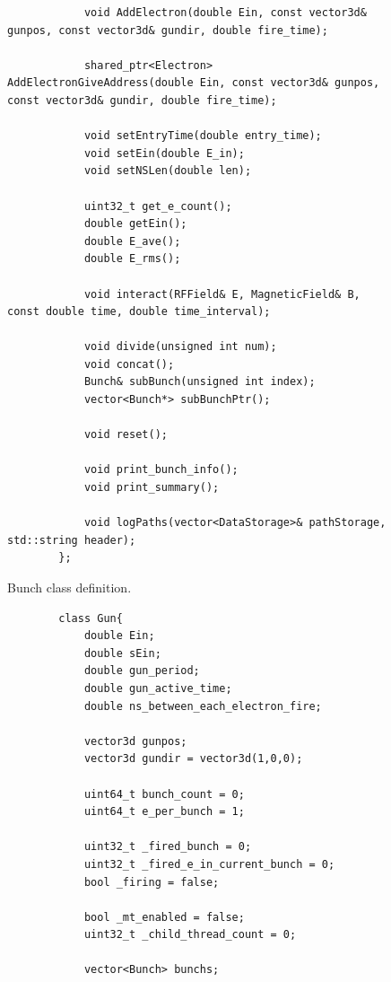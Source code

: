 \documentclass[a4paper,oneside,12pt]{report}
\numberwithin{equation}{chapter}
\begin{document}
{\begin{figure}[H]
\begin{verbatim}
            void AddElectron(double Ein, const vector3d& gunpos, const vector3d& gundir, double fire_time);

            shared_ptr<Electron> AddElectronGiveAddress(double Ein, const vector3d& gunpos, const vector3d& gundir, double fire_time);

            void setEntryTime(double entry_time);
            void setEin(double E_in);
            void setNSLen(double len);

            uint32_t get_e_count();
            double getEin();
            double E_ave();
            double E_rms();

            void interact(RFField& E, MagneticField& B, const double time, double time_interval);

            void divide(unsigned int num);
            void concat();
            Bunch& subBunch(unsigned int index);
            vector<Bunch*> subBunchPtr();

            void reset();

            void print_bunch_info();
            void print_summary();

            void logPaths(vector<DataStorage>& pathStorage, std::string header);
        };
    \end{verbatim}
    \vspace{0pt}
    \caption{Bunch class definition.}
    \label{fig:bunch_class}
\end{figure}

\begin{figure}[H]
    \centering
    \begin{verbatim}
        class Gun{
            double Ein;
            double sEin;
            double gun_period;
            double gun_active_time;
            double ns_between_each_electron_fire;

            vector3d gunpos;
            vector3d gundir = vector3d(1,0,0);

            uint64_t bunch_count = 0;
            uint64_t e_per_bunch = 1;

            uint32_t _fired_bunch = 0;
            uint32_t _fired_e_in_current_bunch = 0;
            bool _firing = false;

            bool _mt_enabled = false;
            uint32_t _child_thread_count = 0;

            vector<Bunch> bunchs;


\end{verbatim}
\end{figure}}
\end{document}

